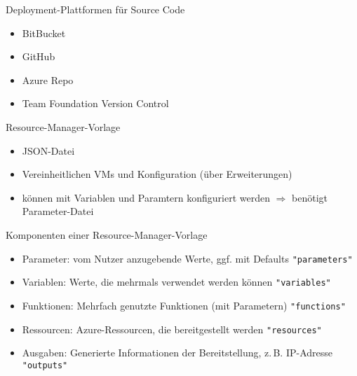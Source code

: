 
\begin{flashcard}[Definition]{Deployment-Plattformen für Source Code}
    \begin{itemize}
        \item BitBucket
        \item GitHub
        \item Azure Repo
        \item Team Foundation Version Control
    \end{itemize}
\end{flashcard}


\begin{flashcard}[Definition]{Resource-Manager-Vorlage}
    \begin{itemize}
        \item JSON-Datei
        \item Vereinheitlichen VMs und Konfiguration (über Erweiterungen)
        \item können mit Variablen und Paramtern konfiguriert werden\newline
            $\Rightarrow$ benötigt Parameter-Datei
    \end{itemize}
\end{flashcard}

\begin{flashcard}[Definition]{Komponenten einer Resource-Manager-Vorlage}
    \begin{itemize}
        \item Parameter: vom Nutzer anzugebende Werte, ggf. mit Defaults\newline
            \texttt{"parameters"}
        \item Variablen: Werte, die mehrmals verwendet werden können\newline
            \texttt{"variables"}
        \item Funktionen: Mehrfach genutzte Funktionen (mit Parametern)\newline
            \texttt{"functions"}
        \item Ressourcen: Azure-Ressourcen, die bereitgestellt werden\newline
            \texttt{"resources"}
        \item Ausgaben: Generierte Informationen der Bereitstellung, z.\,B. IP-Adresse\newline
            \texttt{"outputs"}
    \end{itemize}
\end{flashcard}

